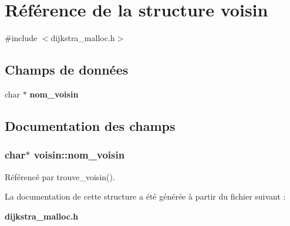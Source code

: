 \section{Référence de la structure voisin}
\label{structvoisin}


{\ttfamily \#include $<$dijkstra\+\_\+malloc.\+h$>$}

\subsection*{Champs de données}
\begin{DoxyCompactItemize}
\item 
char $\ast$ {\bf nom\+\_\+voisin}
\end{DoxyCompactItemize}


\subsection{Documentation des champs}
\subsubsection[{nom\+\_\+voisin}]{\setlength{\rightskip}{0pt plus 5cm}char$\ast$ voisin\+::nom\+\_\+voisin}\label{structvoisin_a1555e66c595e8540ee6794c0760376eb}


Référencé par trouve\+\_\+voisin().



La documentation de cette structure a été générée à partir du fichier suivant \+:\begin{DoxyCompactItemize}
\item 
{\bf dijkstra\+\_\+malloc.\+h}\end{DoxyCompactItemize}
